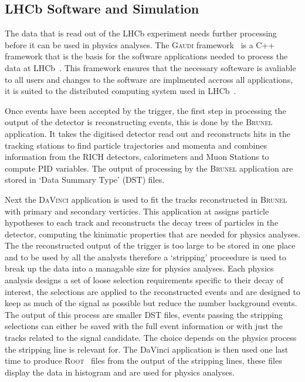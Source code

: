 \subsection{LHCb Software and Simulation}
\label{Software_Simulation}

The data that is read out of the LHCb experiment needs further processing before it can be used in physics analyses. The \textsc{Gaudi} framework~\cite{Mato:1998gfa} is a C++ framework that is the basis for the software applications needed to process the data at LHCb~\cite{Antunes-Nobrega:835156}. This framework ensures that the necessary softeware is avaliable to all users and changes to the software are implmented accross all applications, it is suited to the distributed computing system used in LHCb~\cite{Stagni:2012rs}. 


Once events have been accepted by the trigger, the first step in processing the output of the detector is reconstructing events, this is done by the \textsc{Brunel} application. It takes the digitised detector read out and reconstructs hits in the tracking stations to find particle trajectories and momenta and combines information from the RICH detectors, calorimeters and Muon Stations to compute PID variables. The output of processing by the \textsc{Brunel} application are stored in `Data Summary Type' (DST) files. 

Next the \textsc{DaVinci} application is used to fit the tracks reconstructed in \textsc{Brunel} with primary and secondary verticies. This application at assigns particle hypotheses to each track and reconstructs the decay trees of particles in the detector, computing the kinimatic properties that are needed for physics analyses. The the reconstructed output of the trigger is too large to be stored in one place and to be used by all the analysts therefore a `stripping' proceedure is used to break up the data into a managable size for physics analyses. Each physics analysis designs a set of loose selection requirements specific to their decay of interest, the selections are applied to the reconstructed events and are designed to keep as much of the signal as possible but reduce the number background events. The output of this process are smaller DST files, events passing the stripping selections can either be saved with the full event information or with just the tracks related to the signal candidate. The choice depends on the physics process the stripping line is relevant for. The DaVinci application is then used one last time to produce \textsc{Root}~\cite{Brun:1997pa} files from the output of the stripping lines, these files display the data in histogram and are used for physics analyses. %


